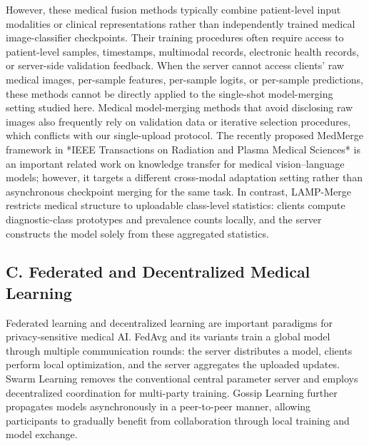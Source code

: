 \documentclass[letterpaper]{article} %
\begin{document}
However, these medical fusion methods typically combine patient-level input modalities or clinical representations rather than independently trained medical image-classifier checkpoints. Their training procedures often require access to patient-level samples, timestamps, multimodal records, electronic health records, or server-side validation feedback. When the server cannot access clients’ raw medical images, per-sample features, per-sample logits, or per-sample predictions, these methods cannot be directly applied to the single-shot model-merging setting studied here. Medical model-merging methods that avoid disclosing raw images also frequently rely on validation data or iterative selection procedures, which conflicts with our single-upload protocol. The recently proposed MedMerge framework in *IEEE Transactions on Radiation and Plasma Medical Sciences* is an important related work on knowledge transfer for medical vision–language models; however, it targets a different cross-modal adaptation setting rather than asynchronous checkpoint merging for the same task. In contrast, LAMP-Merge restricts medical structure to uploadable class-level statistics: clients compute diagnostic-class prototypes and prevalence counts locally, and the server constructs the model solely from these aggregated statistics.

\subsection{C. Federated and Decentralized Medical Learning}

Federated learning and decentralized learning are important paradigms for privacy-sensitive medical AI. FedAvg and its variants train a global model through multiple communication rounds: the server distributes a model, clients perform local optimization, and the server aggregates the uploaded updates. Swarm Learning removes the conventional central parameter server and employs decentralized coordination for multi-party training. Gossip Learning further propagates models asynchronously in a peer-to-peer manner, allowing participants to gradually benefit from collaboration through local training and model exchange.
\end{document}
